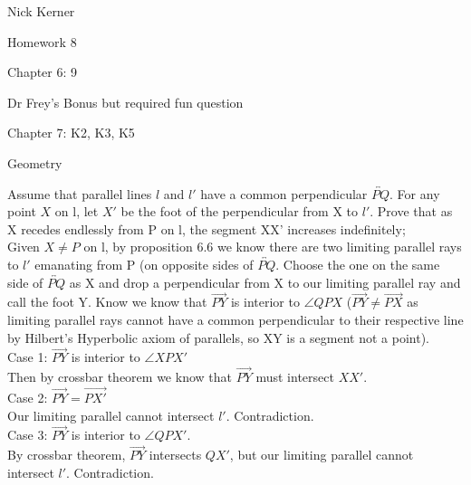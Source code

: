 \documentclass[12pt,letterpaper]{article}
\newcommand{\pro}[1]{\noindent {\bf #1}}
\begin{document}
\begin{flushright}
Nick Kerner

Homework 8

Chapter 6: 9

Dr Frey's Bonus but required fun question

Chapter 7: K2, K3, K5

\end{flushright}
\begin{center}
\large{Geometry}\\
\end{center}

\pro{Chapter 6: problem 9 } Assume that parallel lines $l$ and $l'$ have a common perpendicular $\overleftrightarrow{PQ}$.  For any point $X$ on l, let $X'$ be the foot of the perpendicular from X to $l'$. Prove that as X recedes endlessly from P on l, the segment XX' increases indefinitely;  \\





Given $X\neq P $ on l, by proposition 6.6 we know there are two limiting parallel rays to $l'$ emanating from P (on opposite sides of $\overleftrightarrow{PQ}$.  Choose the one on the same side of $\overleftrightarrow{PQ}$ as X and drop a perpendicular from X to our limiting parallel ray and call the foot Y.   Know we know that $\overrightarrow{PY}$ is interior to $\angle QPX$ ($\overrightarrow{PY}\neq \overrightarrow{PX}$ as limiting parallel rays cannot have a common perpendicular to their respective line by Hilbert's Hyperbolic axiom of parallels, so XY is a segment not a point). \\

Case 1: $\overrightarrow{PY}$ is interior to $\angle XPX'$\\

Then by crossbar theorem we know that $\overrightarrow{PY}$ must intersect $XX'$. \\

Case 2: $\overrightarrow{PY} = \overrightarrow{PX'}$\\

Our limiting parallel cannot intersect $l'$.  Contradiction.\\

Case 3: $\overrightarrow{PY}$ is interior to $\angle QPX'$.\\

By crossbar theorem, $\overrightarrow{PY}$ intersects $QX'$, but our limiting parallel cannot intersect $l'$.  Contradiction.\\
\end{document}
